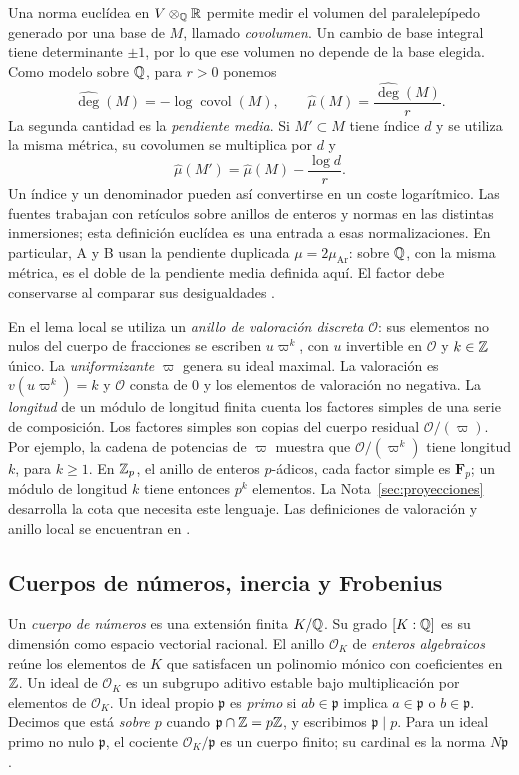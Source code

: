 Una norma euclídea en $V\otimes_{\mathbb{Q}}\mathbb{R}$ permite medir el volumen del
paralelepípedo generado por una base de $M$, llamado \emph{covolumen}.
Un cambio de base integral tiene determinante $\pm1$, por lo que ese
volumen no depende de la base elegida.
Como modelo sobre $\mathbb{Q}$, para $r>0$ ponemos
\[
 \widehat{\deg}(M)=-\log\operatorname{covol}(M),\qquad
 \widehat\mu(M)=\frac{\widehat{\deg}(M)}r.
\]
La segunda cantidad es la \emph{pendiente media}. Si $M'\subset M$
tiene índice $d$ y se utiliza la misma métrica, su covolumen se multiplica
por $d$ y
\[
 \widehat\mu(M')=\widehat\mu(M)-\frac{\log d}{r}.
\]
Un índice y un denominador pueden así convertirse en un coste logarítmico.
Las fuentes trabajan con retículos sobre anillos de enteros y normas en
las distintas inmersiones; esta definición euclídea es una entrada a esas
normalizaciones. En particular, A y B usan la pendiente duplicada
$\mu=2\mu_{\mathrm{Ar}}$: sobre $\mathbb{Q}$, con la misma métrica, es el doble
de la pendiente media definida aquí. El factor debe conservarse al
comparar sus desigualdades \cite[§5, (5.1)--(5.3), pp.~17--18]{fuenteA}
\cite[§4.3, p.~39]{fuenteB}.

En el lema local se utiliza un \emph{anillo de valoración discreta}
$\mathcal O$: sus elementos no nulos del cuerpo de fracciones se escriben
$u\varpi^k$, con $u$ invertible en $\mathcal O$ y $k\in\mathbb{Z}$ único.
La \emph{uniformizante} $\varpi$ genera su ideal maximal.
La valoración es $v(u\varpi^k)=k$ y $\mathcal O$ consta de $0$ y los
elementos de valoración no negativa. La \emph{longitud} de un módulo
de longitud finita cuenta los factores simples de una serie de composición.
Los factores simples son copias del cuerpo residual $\mathcal O/(\varpi)$.
Por ejemplo, la cadena de potencias de $\varpi$ muestra que
$\mathcal O/(\varpi^k)$ tiene longitud $k$, para $k\ge1$.
En $\mathbb{Z}_p$, el anillo de enteros $p$-ádicos, cada factor simple es
$\mathbf F_p$; un módulo de longitud $k$ tiene entonces $p^k$ elementos.
La Nota~\ref{sec:proyecciones} desarrolla la cota que necesita este lenguaje.
Las definiciones de valoración y anillo local se encuentran en
\cite[Lecture 1, §§1.3--1.5]{sutherland-algebra}.

\subsection{Cuerpos de números, inercia y Frobenius}

Un \emph{cuerpo de números} es una extensión finita $K/\mathbb{Q}$.
Su grado $[K:\mathbb{Q}]$ es su dimensión como espacio vectorial racional.
El anillo $\mathcal O_K$ de \emph{enteros algebraicos} reúne los elementos
de $K$ que satisfacen un polinomio mónico con coeficientes en $\mathbb{Z}$.
Un ideal de $\mathcal O_K$ es un subgrupo aditivo estable bajo
multiplicación por elementos de $\mathcal O_K$. Un ideal propio
$\mathfrak p$ es \emph{primo} si $ab\in\mathfrak p$ implica
$a\in\mathfrak p$ o $b\in\mathfrak p$. Decimos que está \emph{sobre $p$}
cuando $\mathfrak p\cap\mathbb{Z}=p\mathbb{Z}$, y escribimos $\mathfrak p\mid p$.
Para un ideal primo no nulo $\mathfrak p$, el cociente $\mathcal O_K/\mathfrak p$ es un
cuerpo finito; su cardinal es la norma $N\mathfrak p$.

